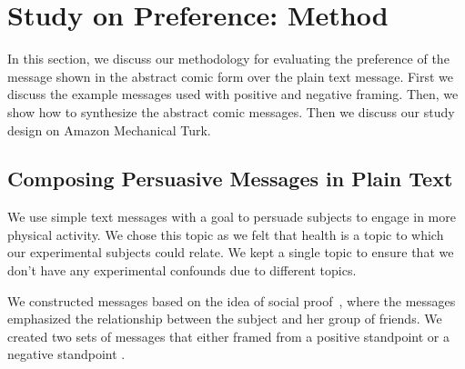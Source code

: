 
\section{Study on Preference: Method}
\label{sec:preference}

In this section, we discuss our methodology for evaluating the preference of the message shown in the abstract comic form over the plain text message. First we discuss the example messages used with positive and negative framing. Then, we show how to synthesize the abstract comic messages. Then we discuss our study design on Amazon Mechanical Turk.


\subsection{Composing Persuasive Messages in Plain Text}
We use simple text messages with a goal to persuade subjects to engage in more physical activity. We chose this topic as we felt that health is a topic to which our experimental subjects could relate. We kept a single topic to ensure that we don't have any experimental confounds due to different topics.


We constructed messages based on the idea of social proof~\cite{goldstein2008room}, where the messages emphasized the relationship between the subject and her group of friends. We created two sets of messages that either framed from a positive standpoint or a negative standpoint \cite{tversky1981framing}.

